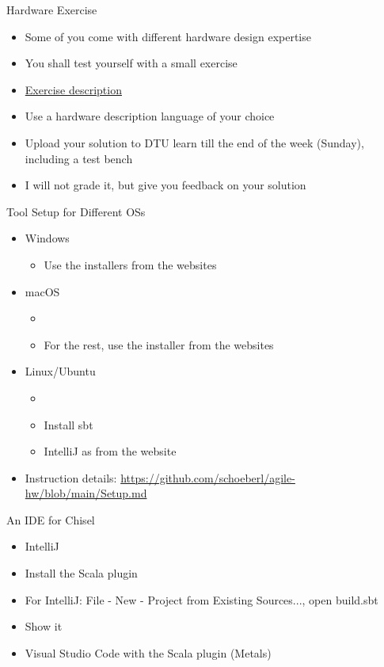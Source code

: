\begin{frame}[fragile]{Hardware Exercise}
\begin{itemize}
\item Some of you come with different hardware design expertise
\item You shall test yourself with a small exercise
\item \href{https://github.com/schoeberl/agile-hw/blob/main/background-exercise.md}{Exercise description}
\item Use a hardware description language of your choice
\item Upload your solution to DTU learn till the end of the week (Sunday), including a test bench
\item I will not grade it, but give you feedback on your solution
\end{itemize}
\end{frame}

\begin{frame}[fragile]{Tool Setup for Different OSs}
\begin{itemize}
\item Windows
\begin{itemize}
\item Use the installers from the websites
\end{itemize}
\item macOS
\begin{itemize}
\item {}
\item For the rest, use the installer from the websites
\end{itemize}
\item Linux/Ubuntu
\begin{itemize}
\item {}
\item Install sbt
\item IntelliJ as from the website
\end{itemize}
\item Instruction details: \url{https://github.com/schoeberl/agile-hw/blob/main/Setup.md}
\end{itemize}
\end{frame}


\begin{frame}[fragile]{An IDE for Chisel}
\begin{itemize}
\item IntelliJ
\item Install the Scala plugin
\item For IntelliJ: File - New - Project from Existing Sources..., open build.sbt
\item Show it %
\item Visual Studio Code with the Scala plugin (Metals)
\end{itemize}
\end{frame}


